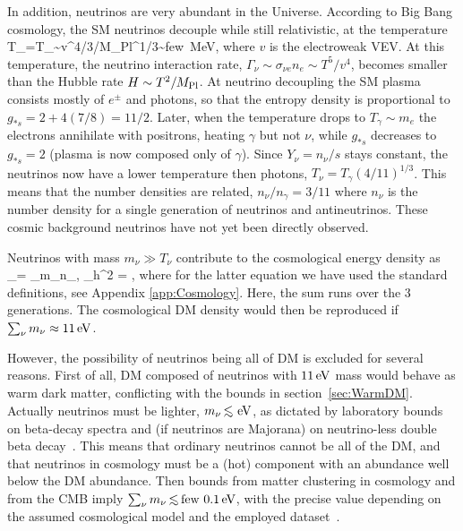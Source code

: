 In addition, neutrinos are very abundant in the Universe. According to  Big Bang cosmology, the SM neutrinos decouple while still relativistic, at the temperature
\beq 
T_\gamma=T_\nu\sim v^{4/3}/M_{\rm Pl}^{1/3}\sim \hbox{few MeV},
\eeq
where $v$ is the electroweak VEV. 
At this temperature, the neutrino interaction rate, $\Gamma_\nu \sim \sigma_{\nu e} n_e \sim T^5/v^4$, becomes smaller than 
the Hubble rate $H \sim T^2/M_{\rm Pl}$.
At neutrino decoupling the SM plasma consists mostly of $e^\pm$ and photons, so that the entropy density  is proportional to
$g_{*s} = 2+ 4(7/8) = 11/2$.
Later, when the temperature drops to $T_\gamma\sim m_e$ the electrons annihilate with positrons, heating $\gamma$ but not $\nu$,
while $g_{*s}$ decreases to $g_{*s}=2$ (plasma is now composed only of $\gamma$).
Since $Y_\nu = n_\nu/s $ stays constant, the neutrinos now have a lower temperature then photons, $T_\nu =T_\gamma (4/11)^{1/3}$.
This means that the number densities are related, $n_\nu/n_\gamma = 3/11$
where $n_\nu$ is the number density for a single generation of neutrinos and antineutrinos.
These cosmic background neutrinos have not yet been directly observed.


Neutrinos with mass $m_\nu \gg T_\nu$ contribute to the cosmological
energy density as
\beq
\label{eq:rhonu}
\rho_\nu = \sum_\nu m_\nu n_\nu,  \quad \Omega_\nu h^2 = ,
\eeq
where for the latter equation we have used the standard definitions, see Appendix \ref{app:Cosmology}. Here, the sum runs over the 3 generations. The cosmological DM density would then be reproduced if $\sum_\nu  m_\nu \approx 11\,{\rm eV}$.

\medskip

However, the possibility of neutrinos being all of DM is excluded for several reasons.
First of all, DM composed of neutrinos with $11\,{\rm eV}$ mass would behave as warm dark matter, conflicting with the bounds in section~\ref{sec:WarmDM}.
Actually neutrinos must be lighter, $m_\nu \circa{<}\eV$, 
as dictated by laboratory bounds on beta-decay spectra and (if neutrinos are Majorana) on neutrino-less double beta decay~\cite{NuOsc,mnu_KATRIN}.
This means that ordinary neutrinos cannot be all of the DM, and that neutrinos in cosmology must be a (hot) component with an abundance well below the DM abundance.
Then bounds from matter clustering in cosmology and from the CMB imply $\sum_\nu m_\nu \circa{<}\hbox{few}\ 0.1\eV$, with the precise value depending on the assumed cosmological model and the employed dataset~\cite{mnu_cosmo}. 


